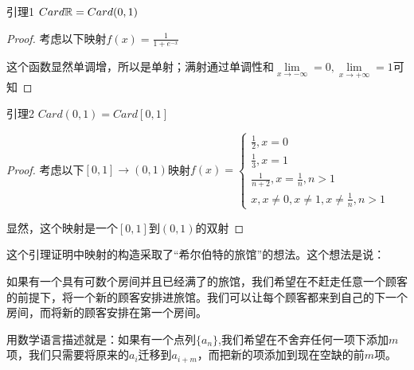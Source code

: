\documentclass[12pt, a4paper, oneside, UTF8]{ctexbook}
\begin{document}
			\begin{lemma}{引理1}{}
				$Card \mathbb{R} = Card (0,1)$
			\end{lemma}
			\begin{proof}
				考虑以下映射$f(x)=\frac{1}{1+e^{-x}}$
				
				这个函数显然单调增，所以是单射；满射通过单调性和$\lim\limits_{x\to - \infty}=0,\lim\limits_{x\to +\infty}=1$可知
			\end{proof}
			\begin{lemma}{引理2}{}
				$Card (0,1) = Card [0,1]$
			\end{lemma}
			\begin{proof}
				考虑以下$[0,1]\rightarrow(0,1)$映射$f(x)=\begin{cases}
					\frac{1}{2},x=0 \\
					\frac{1}{3},x=1 \\
					\frac{1}{n+2},x=\frac{1}{n},n>1 \\
					x,x\neq 0,x\neq 1,x\neq \frac{1}{n},n>1
					\end{cases}$
					
				显然，这个映射是一个$[0,1]$到$(0,1)$的双射
			\end{proof}
			这个引理证明中映射的构造采取了“希尔伯特的旅馆”的想法。这个想法是说：
			
			如果有一个具有可数个房间并且已经满了的旅馆，我们希望在不赶走任意一个顾客的前提下，将一个新的顾客安排进旅馆。我们可以让每个顾客都来到自己的下一个房间，而将新的顾客安排在第一个房间。
			
			用数学语言描述就是：如果有一个点列$\{a_n\}$,我们希望在不舍弃任何一项下添加$m$项，我们只需要将原来的$a_i$迁移到$a_{i+m}$，而把新的项添加到现在空缺的前$m$项。
			
\end{document}
